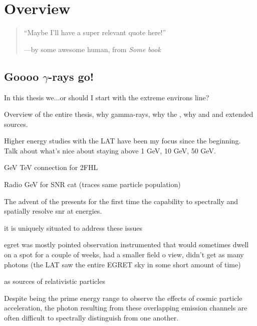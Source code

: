 \chapter{Overview}
\label{chap:intro}

\begin{quote}
	``Maybe I'll have a super relevant quote here!'' 
	\begin{center}---by some awesome human, from \it{Some book} \end{center}
\end{quote}

\section{Goooo $\gamma$-rays go!}
In this thesis we...or should I start with the extreme environs line?

Overview of the entire thesis, why gamma-rays, why the \lat, why \snr and \pwn and extended sources.

Higher energy studies with the LAT have been my focus since the beginning. Talk about what's nice about staying above 1 GeV, 10 GeV, 50 GeV. 

GeV TeV connection for 2FHL

Radio GeV for SNR cat (traces same particle population)

The advent of the \lat presents for the first time the capability to spectrally and spatially resolve \gls{snr} at \gev energies.

it is uniquely situated to address these issues

egret was mostly pointed observation instrumented that would sometimes dwell on a spot for a couple of weeks, had a smaller field o view, didn't get as many photons (the LAT saw the entire EGRET sky in some short amount of time)

\snrs as sources of relativistic particles

Despite being the prime energy range to observe the effects of cosmic particle acceleration, the photon \sed{} resulting from these overlapping emission channels are often difficult to spectrally distinguish from one another. 

